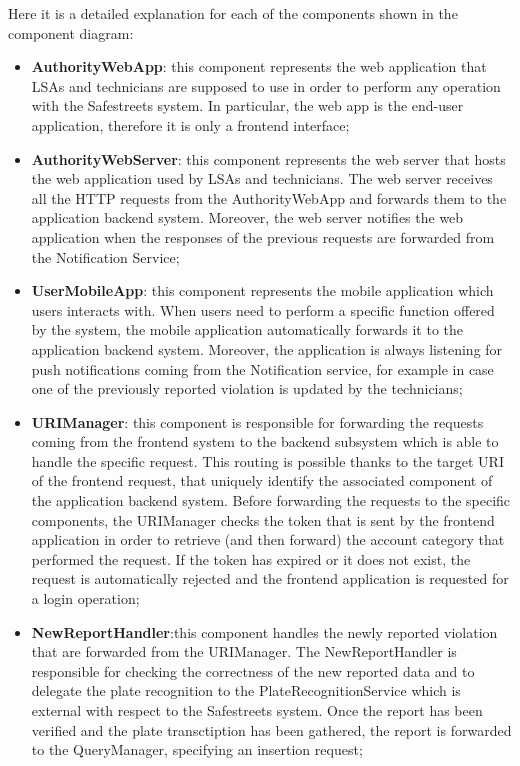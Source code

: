 Here it is a detailed explanation for each of the components shown in the component diagram:
\begin{itemize}%
    \item \textbf{AuthorityWebApp}: this component represents the web application that LSAs and technicians are supposed to use in order to perform any operation with the Safestreets system. In particular, the web app is the end-user application, therefore it is only a frontend interface;
    \item \textbf{AuthorityWebServer}: this component represents the web server that hosts the web application used by LSAs and technicians. The web server receives all the HTTP requests from the AuthorityWebApp and forwards them to the application backend system. Moreover, the web server notifies the web application when the responses of the previous requests are forwarded from the Notification Service;
    \item \textbf{UserMobileApp}: this component represents the mobile application which users interacts with. When users need to perform a specific function offered by the system, the mobile application automatically forwards it to the application backend system. Moreover, the application is always listening for push notifications coming from the Notification service, for example in case one of the previously reported violation is updated by the technicians;
    \item \textbf{URIManager}: this component is responsible for forwarding the requests coming from the frontend system to the backend subsystem which is able to handle the specific request. This routing is possible thanks to the target URI of the frontend request, that uniquely identify the associated component of the application backend system. Before forwarding the requests to the specific components, the URIManager checks the token that is sent by the frontend application in order to retrieve (and then forward) the account category that performed the request. If the token has expired or it does not exist, the request is automatically rejected and the frontend application is requested for a login operation;
    \item \textbf{NewReportHandler}:this component handles the newly reported violation that are forwarded from the URIManager. The NewReportHandler is responsible for checking the correctness of the new reported data and to delegate the plate recognition to the PlateRecognitionService which is external with respect to the Safestreets system. Once the report has been verified and the plate transctiption has been gathered, the report is forwarded to the QueryManager, specifying an insertion request;

\end{itemize}
